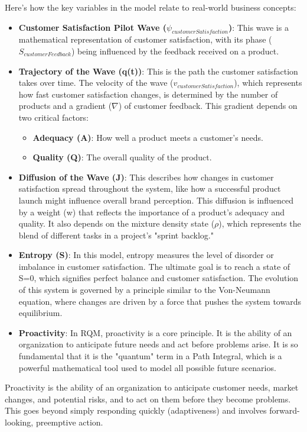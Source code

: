 \documentclass{article}
\begin{document}
Here's how the key variables in the model relate to real-world business concepts:
\begin{itemize}
\item \textbf{Customer Satisfaction Pilot Wave ($\psi_{customerSatisfaction}$)}: This wave is a mathematical representation of customer satisfaction, with its phase ($S_{customerFeedback}$) being influenced by the feedback received on a product.
\item \textbf{Trajectory of the Wave (q(t))}: This is the path the customer satisfaction takes over time. The velocity of the wave ($v_{customerSatisfaction}$), which represents how fast customer satisfaction changes, is determined by the number of products and a gradient ($\nabla$) of customer feedback. This gradient depends on two critical factors:
\begin{itemize}
\item \textbf{Adequacy (A)}: How well a product meets a customer's needs.
\item \textbf{Quality (Q)}: The overall quality of the product.
\end{itemize}
\item \textbf{Diffusion of the Wave (J)}: This describes how changes in customer satisfaction spread throughout the system, like how a successful product launch might influence overall brand perception. This diffusion is influenced by a weight (w) that reflects the importance of a product's adequacy and quality. It also depends on the mixture density state ($\rho$), which represents the blend of different tasks in a project's "sprint backlog."
\item \textbf{Entropy (S)}: In this model, entropy measures the level of disorder or imbalance in customer satisfaction. The ultimate goal is to reach a state of S=0, which signifies perfect balance and customer satisfaction. The evolution of this system is governed by a principle similar to the Von-Neumann equation, where changes are driven by a force that pushes the system towards equilibrium.
\item \textbf{Proactivity}: In RQM, proactivity is a core principle. It is the ability of an organization to anticipate future needs and act before problems arise. It is so fundamental that it is the "quantum" term in a Path Integral, which is a powerful mathematical tool used to model all possible future scenarios.
\end{itemize}


Proactivity is the ability of an organization to anticipate customer needs, market changes, and potential risks, and to act on them before they become problems. This goes beyond simply responding quickly (adaptiveness) and involves forward-looking, preemptive action.
\end{document}
